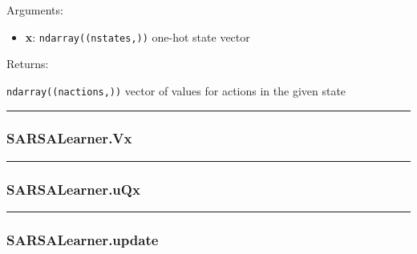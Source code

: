 Arguments:

\begin{itemize}
\tightlist
\item
  \textbf{x}: \texttt{ndarray((nstates,))} one-hot state vector
\end{itemize}

Returns:

\texttt{ndarray((nactions,))} vector of values for actions in the given
state

\begin{center}\rule{0.5\linewidth}{\linethickness}\end{center}

\hypertarget{sarsalearner.vx}{%
\subsubsection{SARSALearner.Vx}\label{sarsalearner.vx}}

\begin{Shaded}
\begin{Highlighting}[]
\end{Highlighting}
\end{Shaded}

\begin{center}\rule{0.5\linewidth}{\linethickness}\end{center}

\hypertarget{sarsalearner.uqx}{%
\subsubsection{SARSALearner.uQx}\label{sarsalearner.uqx}}

\begin{Shaded}
\begin{Highlighting}[]
\end{Highlighting}
\end{Shaded}

\begin{center}\rule{0.5\linewidth}{\linethickness}\end{center}

\hypertarget{sarsalearner.update}{%
\subsubsection{SARSALearner.update}\label{sarsalearner.update}}

